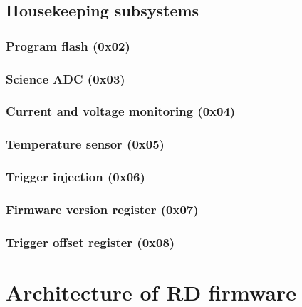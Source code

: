 \documentclass[a4paper,indent]{paper}
\begin{document}
\subsection{Housekeeping subsystems}

\subsubsection{Program flash (0x02)}

\subsubsection{Science ADC (0x03)}

\subsubsection{Current and voltage monitoring (0x04)}

\subsubsection{Temperature sensor (0x05)}

\subsubsection{Trigger injection (0x06)}

\subsubsection{Firmware version register (0x07)}

\subsubsection{Trigger offset register (0x08)}

\section{Architecture of RD firmware}
\end{document}
